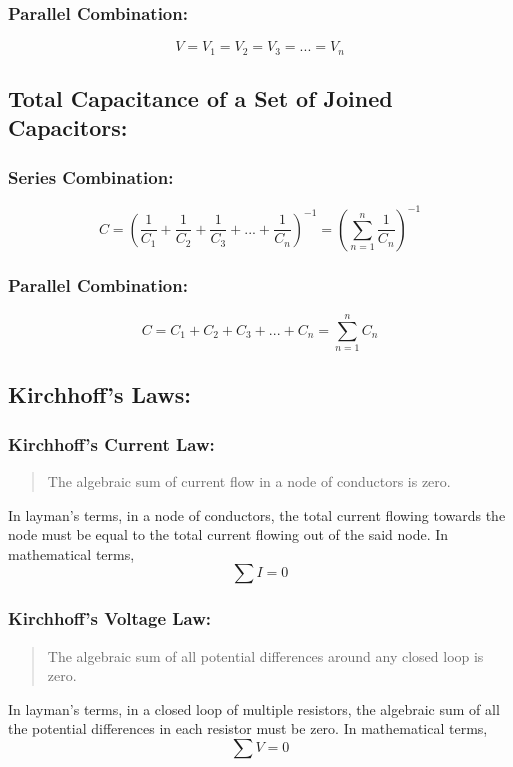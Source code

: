 \documentclass[a4paper]{report}
\begin{document}
            \subsubsection{Parallel Combination:}
                \begin{equation}
                    V = V_1 = V_2 = V_3 = ... = V_n
                \end{equation}
        \subsection{Total Capacitance of a Set of Joined Capacitors:}
            \subsubsection{Series Combination:}    
                \begin{equation}
                    C = (\frac{1}{C_1} + \frac{1}{C_2} + \frac{1}{C_3} + ... + \frac{1}{C_n})^{-1} = (\sum_{n = 1}^n \frac{1}{C_n})^{-1}
                \end{equation}
            \subsubsection{Parallel Combination:}
                \begin{equation}
                    C = C_1 + C_2 + C_3 + ... + C_n = \sum_{n = 1}^n C_n
                \end{equation}
        \subsection{Kirchhoff's Laws:}
            \subsubsection{Kirchhoff's Current Law:}
                \begin{quotation}
                    The algebraic sum of current flow in a node of conductors is zero.
                \end{quotation}
                In layman's terms, in a node of conductors, the total current flowing towards the node must be equal to the total current flowing out of the said node. In mathematical terms,
                \begin{equation}
                    \sum I = 0
                \end{equation}
            \subsubsection{Kirchhoff's Voltage Law:}
                \begin{quotation}
                    The algebraic sum of all potential differences around any closed loop is zero.
                \end{quotation}
                In layman's terms, in a closed loop of multiple resistors, the algebraic sum of all the potential differences in each resistor must be zero. In mathematical terms,
                \begin{equation}
                    \sum V = 0
                \end{equation}
\end{document}
